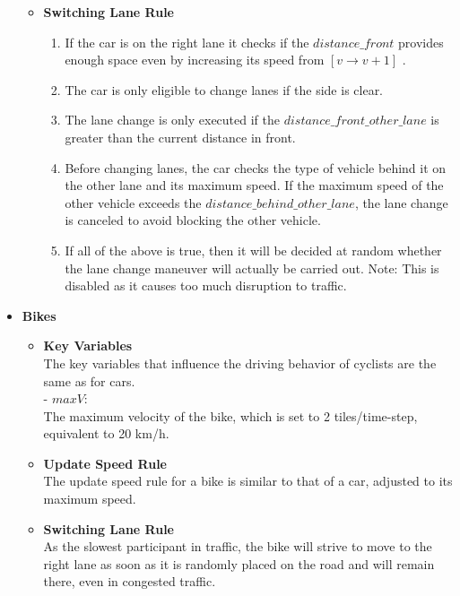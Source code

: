 \begin{itemize}
\begin{itemize}
         \item \textbf{Switching Lane Rule}
         \begin{enumerate}
         \item If the car is on the right lane it checks if the $distance\_front$ provides enough space even by increasing its speed from $[v \rightarrow v+1]$ .
         \item The car is only eligible to change lanes if the side is clear.
         \item The lane change is only executed if the $distance\_front\_other\_lane$ is greater than the current distance in front.
         \item Before changing lanes, the car checks the type of vehicle behind it on the other lane and its maximum speed. If the maximum speed of the other vehicle exceeds the $distance\_behind\_other\_lane$, the lane change is canceled to avoid blocking the other vehicle.
         \item If all of the above is true, then it will be decided at random whether the lane change maneuver will actually be carried out. Note: This is disabled as it causes too much disruption to traffic.
         \end{enumerate}     
     \end{itemize}

     \item \textbf{Bikes}
     \begin{itemize}
         \item \textbf{Key Variables}\\
         The key variables that influence the driving behavior of cyclists are the same as for cars.\\
         - $maxV$: \\
         The maximum velocity of the bike, which is set to 2 tiles/time-step, equivalent to 20 km/h.\\
         \item \textbf{Update Speed Rule}\\
         The update speed rule for a bike is similar to that of a car, adjusted to its maximum speed.\\
         \item \textbf{Switching Lane Rule}\\
         As the slowest participant in traffic, the bike will strive to move to the right lane as soon as it is randomly placed on the road and will remain there, even in congested traffic.
     \end{itemize}


\end{itemize}
